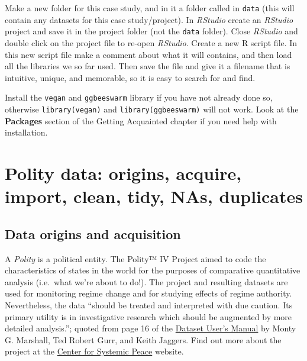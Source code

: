 \documentclass[]{book}
\begin{document}
Make a new folder for this case study, and in it a folder called in \texttt{data} (this will contain any datasets for this case study/project). In \emph{RStudio} create an \emph{RStudio} project and save it in the project folder (not the \texttt{data} folder). Close \emph{RStudio} and double click on the project file to re-open \emph{RStudio}. Create a new R script file. In this new script file make a comment about what it will contains, and then load all the libraries we so far used. Then save the file and give it a filename that is intuitive, unique, and memorable, so it is easy to search for and find.

\begin{action}
Install the \texttt{vegan} and \texttt{ggbeeswarm} library if you have
not already done so, otherwise \texttt{library(vegan)} and
\texttt{library(ggbeeswarm)} will not work. Look at the
\textbf{Packages} section of the Getting Acquainted chapter if you need
help with installation.
\end{action}

\hypertarget{polity-data-origins-acquire-import-clean-tidy-nas-duplicates}{%
\section{Polity data: origins, acquire, import, clean, tidy, NAs, duplicates}\label{polity-data-origins-acquire-import-clean-tidy-nas-duplicates}}

\hypertarget{data-origins-and-acquisition}{%
\subsection{Data origins and acquisition}\label{data-origins-and-acquisition}}

A \emph{Polity} is a political entity. The Polity™ IV Project aimed to code the characteristics of states in the world for the purposes of comparative quantitative analysis (i.e.~what we're about to do!). The project and resulting datasets are used for monitoring regime change and for studying effects of regime authority. Nevertheless, the data ``should be treated and interpreted with due caution. Its primary utility is in investigative research which should be augmented by more detailed analysis.''; quoted from page 16 of the \href{https://www.systemicpeace.org/inscr/p4manualv2016.pdf}{Dataset User's Manual} by Monty G. Marshall, Ted Robert Gurr, and Keith Jaggers. Find out more about the project at the \href{http://www.systemicpeace.org/polityproject.html}{Center for Systemic Peace} website.
\end{document}
